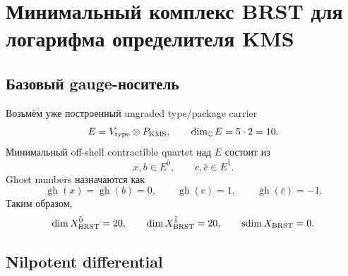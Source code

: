\chapter{Минимальный комплекс BRST для логарифма определителя KMS}
\label{ch:v9-kms-logdet-minimal-brst}

\section{Базовый gauge-носитель}

Возьмём уже построенный ungraded type/package carrier
\begin{equation}
 E=V_{\rm type}\otimes P_{\rm KMS},
 \qquad \dim_{\mathbb C}E=5\cdot2=10.
 \label{eq:v9-kms-brst-base-carrier}
\end{equation}
Минимальный off-shell contractible quartet над $E$ состоит из
\begin{equation}
 x,b\in E^{\bar0},
 \qquad
 c,\bar c\in E^{\bar1}.
 \label{eq:v9-kms-brst-fields}
\end{equation}
Ghost numbers назначаются как
\begin{equation}
 \operatorname{gh}(x)=\operatorname{gh}(b)=0,
 \qquad
 \operatorname{gh}(c)=1,
 \qquad
 \operatorname{gh}(\bar c)=-1.
 \label{eq:v9-kms-brst-ghost-numbers}
\end{equation}
Таким образом,
\begin{equation}
 \dim X_{\rm BRST}^{\bar0}=20,\qquad
 \dim X_{\rm BRST}^{\bar1}=20,\qquad
 \operatorname{sdim}X_{\rm BRST}=0.
 \label{eq:v9-kms-brst-superdimension}
\end{equation}

\section{Nilpotent differential}

